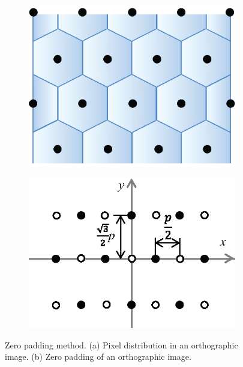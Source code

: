 \documentclass[10pt,letterpaper]{article}
\begin{document}
\begin{figure}[htb]
            \centering
	\captionsetup[subfigure]{justification=centering}
	\begin{subfigure}[b]{0.3\linewidth}
	\centering
	\includegraphics[width=1\columnwidth]{fig6_a}
	\caption{}
	\end{subfigure}
	\begin{subfigure}[b]{0.3\linewidth}
	\includegraphics[width=1\columnwidth]{fig6_b}
	\centering
	\caption{}
	\end{subfigure}
\caption{Zero padding method. (a) Pixel distribution in an orthographic image. (b) Zero padding of an orthographic image.}
\label{fig_6}
\end{figure}
\end{document}
